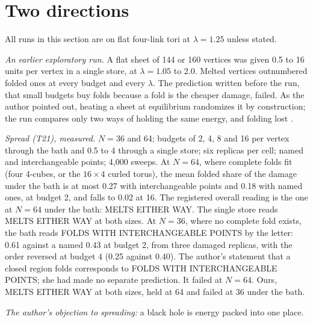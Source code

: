 \documentclass[aps,pre,10pt,twocolumn,superscriptaddress,nofootinbib]{revtex4-2}
\begin{document}
\section{Two directions}\label{sec:two}

All runs in this section are on flat four-link tori at $\lambda = 1.25$ unless stated.

\emph{An earlier exploratory run.} A flat sheet of 144 or 160 vertices was given 0.5 to 16 units per vertex in a single
store, at $\lambda = 1.05$ to 2.0. Melted vertices outnumbered folded ones at every budget and every $\lambda$. The
prediction written before the run, that small budgets buy folds because a fold is the cheaper damage, failed. As
the author pointed out, heating a sheet at equilibrium randomizes it by construction; the run compares only two ways
of holding the same energy, and folding lost \cite{repo}.

\emph{Spread (T21), measured.} $N = 36$ and 64; budgets of 2, 4, 8 and 16 per vertex through the bath and 0.5 to 4
through a single store; six replicas per cell; named and interchangeable points; 4,000 sweeps. At $N = 64$, where
complete folds fit (four 4-cubes, or the $16 \times 4$ curled torus), the mean folded share of the damage under the
bath is at most 0.27 with interchangeable points and 0.18 with named ones, at budget 2, and falls to 0.02 at 16. The
registered overall reading is the one at $N = 64$ under the bath: MELTS EITHER WAY. The single store reads MELTS
EITHER WAY at both sizes. At $N = 36$, where no complete fold exists, the bath reads FOLDS WITH INTERCHANGEABLE
POINTS by the letter: 0.61 against a named 0.43 at budget 2, from three damaged replicas, with the order reversed at
budget 4 (0.25 against 0.40). The author's statement that a closed region folds corresponds to FOLDS WITH
INTERCHANGEABLE POINTS; she had made no separate prediction. It failed at $N = 64$. Ours, MELTS EITHER WAY at both sizes,
held at 64 and failed at 36 under the bath.

\emph{The author's objection to spreading:} a black hole is energy packed into one place.
\end{document}
